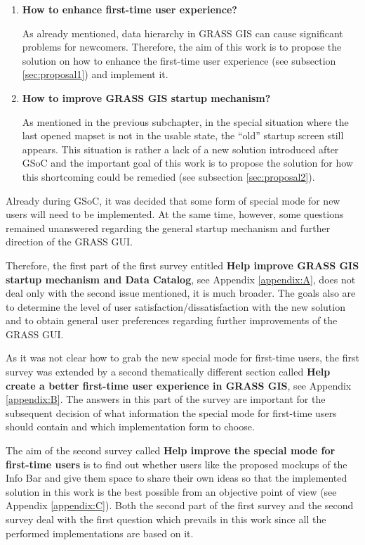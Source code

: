 \documentclass[a4paper,10pt,twoside]{article}
\begin{document}
\begin{enumerate}

\item  \noindent \textbf{How to enhance first-time user experience?}

  \noindent As already mentioned, data hierarchy in GRASS GIS can
  cause significant problems for newcomers. Therefore, the aim of this
  work is to propose the solution on how to enhance the first-time
  user experience (see subsection \ref{sec:proposal1}) and implement
  it.


\item \noindent \textbf{How to improve GRASS GIS startup mechanism?}

  As mentioned in the previous subchapter, in the special situation
  where the last opened mapset is not in the usable state, the ``old''
  startup screen still appears. This situation is rather a lack of a
  new solution introduced after GSoC and the important goal of this
  work is to propose the solution for how this shortcoming could be
  remedied (see subsection \ref{sec:proposal2}).

\end{enumerate}

\noindent Already during GSoC, it was decided that some form of
special mode for new users will need to be implemented. At the same
time, however, some questions remained unanswered regarding the
general startup mechanism and further direction of the GRASS GUI.

Therefore, the first part of the first survey entitled \textbf {Help
  improve GRASS GIS startup mechanism and Data Catalog}, see Appendix
\ref{appendix:A}, does not deal only with the second issue mentioned,
it is much broader. The goals also are to determine the level of user
satisfaction/dissatisfaction with the new solution and to obtain
general user preferences regarding further improvements of the GRASS
GUI.

As it was not clear how to grab the new special mode for first-time
users, the first survey was extended by a second thematically
different section called \textbf{Help create a better first-time user
  experience in GRASS GIS}, see Appendix \ref{appendix:B}. The answers
in this part of the survey are important for the subsequent decision
of what information the special mode for first-time users should
contain and which implementation form to choose.

The aim of the second survey called \textbf{Help improve the special
  mode for first-time users} is to find out whether users like the
proposed mockups of the Info Bar and give them space to share their
own ideas so that the implemented solution in this work is the best
possible from an objective point of view (see Appendix
\ref{appendix:C}). Both the second part of the first survey and the
second survey deal with the first question which prevails in this work
since all the performed implementations are based on it.
\end{document}
